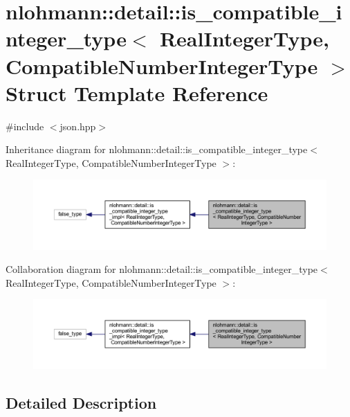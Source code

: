\hypertarget{structnlohmann_1_1detail_1_1is__compatible__integer__type}{}\section{nlohmann\+::detail\+::is\+\_\+compatible\+\_\+integer\+\_\+type$<$ Real\+Integer\+Type, Compatible\+Number\+Integer\+Type $>$ Struct Template Reference}
\label{structnlohmann_1_1detail_1_1is__compatible__integer__type}


{\ttfamily \#include $<$json.\+hpp$>$}



Inheritance diagram for nlohmann\+::detail\+::is\+\_\+compatible\+\_\+integer\+\_\+type$<$ Real\+Integer\+Type, Compatible\+Number\+Integer\+Type $>$\+:
\nopagebreak
\begin{figure}[H]
\begin{center}
\leavevmode
\includegraphics[width=350pt]{structnlohmann_1_1detail_1_1is__compatible__integer__type__inherit__graph}
\end{center}
\end{figure}


Collaboration diagram for nlohmann\+::detail\+::is\+\_\+compatible\+\_\+integer\+\_\+type$<$ Real\+Integer\+Type, Compatible\+Number\+Integer\+Type $>$\+:
\nopagebreak
\begin{figure}[H]
\begin{center}
\leavevmode
\includegraphics[width=350pt]{structnlohmann_1_1detail_1_1is__compatible__integer__type__coll__graph}
\end{center}
\end{figure}


\subsection{Detailed Description}
